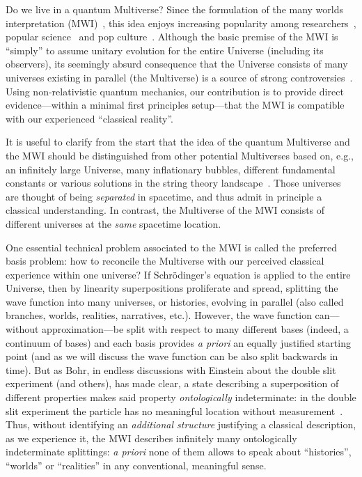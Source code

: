 \documentclass[pre,twocolumn,10pt,aps,longbibliography,nofootinbib]{revtex4-1}
\newcommand{\new}[1]{#1}
\begin{document}
Do we live in a quantum Multiverse? Since the formulation of the many worlds interpretation (MWI)~\cite{EverettRMP1957, DeWittPT1970, Vaidman2021}, this idea enjoys increasing popularity among researchers~\cite{Carr2007, SaundersEtAlBook2010, WallaceBook2012}, popular science~\cite{CarrollPodcast2022} and pop culture~\cite{EEAAO2022}. Although the basic premise of the MWI is ``simply'' to assume \new{unitary evolution} for the entire Universe (including its observers), its seemingly absurd consequence that the Universe consists of many universes existing in parallel (the Multiverse) is a source of strong controversies~\cite{GisinArXiv2022}. Using non-relativistic quantum mechanics, our contribution is to provide direct evidence---within a minimal first principles setup---that the MWI is compatible with our experienced ``classical reality''.

It is useful to clarify from the start that the idea of the quantum Multiverse and the MWI should be distinguished from other potential Multiverses based on, e.g., \new{an infinitely large Universe}, many inflationary bubbles, different fundamental constants or various solutions in the string theory landscape~\cite{TegmarkSA2003, Carr2007}. Those universes are thought of being \emph{separated} in spacetime, and thus admit in principle a classical understanding. In contrast, the Multiverse of the MWI consists of different universes at the \emph{same} spacetime location.

\new{One} essential technical problem associated to the MWI is called the preferred basis problem: how to reconcile the Multiverse with our perceived classical experience within one universe? If \new{Schr\"odinger's equation} is applied to the entire Universe, then by linearity superpositions proliferate and spread, splitting the wave function into many universes, or histories, evolving in parallel (also called branches, worlds, realities, narratives, etc.). However, the wave function can---without approximation---be split with respect to many different bases (indeed, a continuum of bases) and each basis provides \emph{a priori} an equally justified starting point (and as we will discuss the wave function can be also split backwards in time). But as Bohr, in endless discussions with Einstein about the double slit experiment (and others), has made clear, a state describing a superposition of different properties makes said property \emph{ontologically} indeterminate: in the double slit experiment the particle has no meaningful location without measurement~\cite{Barad2007}. Thus, without identifying an \emph{additional structure} justifying a classical description, as we experience it, the MWI describes infinitely many ontologically indeterminate splittings: \emph{a priori} none of them allows to speak about ``histories'', ``worlds'' or ``realities'' in any conventional, meaningful sense.
\end{document}
